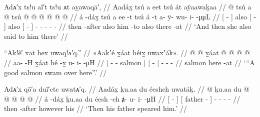 \ex\label{ex:100-124-she-said-to-him-there}%
%
\begingl
	\glpreamble	Adᴀ′x ts!u aî′t ts!u ᴀt aỵawaqā′, //
	\glpreamble	Aadáx̱ tsú a eet tsú át aÿaawaḵaa //
	\gla	{}  @ {} {} tsú 
		{} a  @ {} {} tsú 
		{}  @ {} {}
		 @ {} @ {} @ {} @ {} @ {} //
	\glb	{} á -dáx̱ {} tsú
		{} a ee -t {} tsú
		{} á -t {} 
		a- ÿ- wu- i-  -μμL //
	\glc	{}[  - {}] also
		{}[   - {}] also 
		{}[  - {}]
		- - - -  - //
	\gld	{} then -after {} also 
		{} him {} -to {} also 
		{} there -at {}
		 {} {} {} {} {} //
	\glft	‘And then she also said to him there’
		//
\endgl
\xe

\ex\label{ex:100-125-good-salmon-swimming-here}%
%
\begingl
	\glpreamble	“Ak!ê′ xāt hēx uwaq!ᴀ′q.” //
	\glpreamble	«\!Aakʼé x̱áat héix̱ uwaxʼák\!». //
	\gla	{}  @ {} @ {} x̱áat {}
		{}  @ {} {} 
		 @ {} @ {} @ {} //
	\glb	{} aa-  -H x̱áat {}
		{} hé -x̱ {} 
		u- i-  -μH // 
	\glc	{}[ -  - salmon {}]
		{}[  - {}]
		- -  - //
	\gld	{}  {} {} salmon {}
		{} here -at {} 
		 {} {} {} //
	\glft	‘“A good salmon swam over here”.’
		//
\endgl
\xe

\ex\label{ex:100-126-father-speared-him}%
%
\begingl
	\glpreamble	Adᴀ′x qō′a duī′ctc uwatᴀ′q. //
	\glpreamble	Aadáx̱ ḵu.aa du éeshch uwatáḵ. //
	\gla	{}  @ {} {} ḵu.aa 
		{} du  @ {} {} 
		 @ {} @ {} @ {} @ {} //
	\glb	{} á -dáx̱ {} ḵu.aa 
		{} du éesh -ch {} 
		ⱥ- u-  i-  -μH //
	\glc	{}[  - {}]  
		{}[  father - {}]
		- - -  - //
	\gld	{} then -after {} however 
		{} his  {} {}
		 {} {} {} {} //
	\glft	‘Then his father speared him.’
		//
\endgl
\xe

